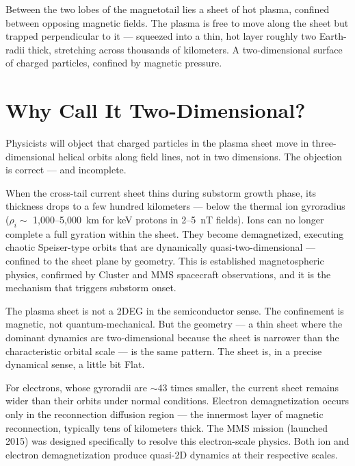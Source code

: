 
Between the two lobes of the magnetotail lies a sheet of hot plasma, confined between opposing magnetic fields. The plasma is free to move along the sheet but trapped perpendicular to it --- squeezed into a thin, hot layer roughly two Earth-radii thick, stretching across thousands of kilometers. A two-dimensional surface of charged particles, confined by magnetic pressure.

\section*{Why Call It Two-Dimensional?}
\label{pos32:ws-quasi-2d}

Physicists will object that charged particles in the plasma sheet move in three-dimensional helical orbits along field lines, not in two dimensions. The objection is correct --- and incomplete.

When the cross-tail current sheet thins during substorm growth phase, its thickness drops to a few hundred kilometers --- below the thermal ion gyroradius ($\rho_i \sim$ 1,000--5,000~km for keV protons in 2--5~nT fields). Ions can no longer complete a full gyration within the sheet. They become demagnetized, executing chaotic Speiser-type orbits that are dynamically quasi-two-dimensional --- confined to the sheet plane by geometry. This is established magnetospheric physics, confirmed by Cluster and MMS spacecraft observations, and it is the mechanism that triggers substorm onset.

The plasma sheet is not a 2DEG in the semiconductor sense. The confinement is magnetic, not quantum-mechanical. But the geometry --- a thin sheet where the dominant dynamics are two-dimensional because the sheet is narrower than the characteristic orbital scale --- is the same pattern. The sheet is, in a precise dynamical sense, a little bit Flat.

For electrons, whose gyroradii are $\sim$43 times smaller, the current sheet remains wider than their orbits under normal conditions. Electron demagnetization occurs only in the reconnection diffusion region --- the innermost layer of magnetic reconnection, typically tens of kilometers thick. The MMS mission (launched 2015) was designed specifically to resolve this electron-scale physics. Both ion and electron demagnetization produce quasi-2D dynamics at their respective scales.

